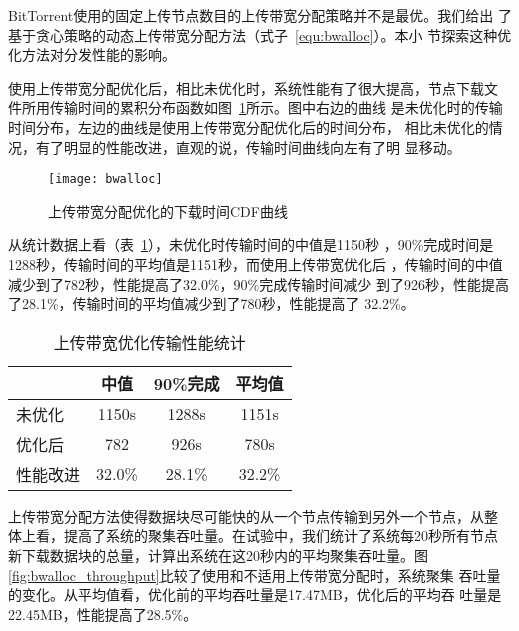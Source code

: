 BitTorrent使用的固定上传节点数目的上传带宽分配策略并不是最优。我们给出
了基于贪心策略的动态上传带宽分配方法（式子~\ref{equ:bwalloc}）。本小
节探索这种优化方法对分发性能的影响。

使用上传带宽分配优化后，相比未优化时，系统性能有了很大提高，节点下载文
件所用传输时间的累积分布函数如图~\ref{fig:bwalloc}所示。图中右边的曲线
是未优化时的传输时间分布，左边的曲线是使用上传带宽分配优化后的时间分布，
相比未优化的情况，有了明显的性能改进，直观的说，传输时间曲线向左有了明
显移动。

\begin{figure}[htbp]
  \centering
  \begin{minipage}{0.6\linewidth}
    \centering
    \texttt{[image: bwalloc]}
    \caption{上传带宽分配优化的下载时间CDF曲线}
    \label{fig:bwalloc}
  \end{minipage}
\end{figure}

从统计数据上看（表~\ref{tbl:bwalloc}），未优化时传输时间的中值是1150秒
，90\%完成时间是1288秒，传输时间的平均值是1151秒，而使用上传带宽优化后
，传输时间的中值减少到了782秒，性能提高了32.0\%，90\%完成传输时间减少
到了926秒，性能提高了28.1\%，传输时间的平均值减少到了780秒，性能提高了
32.2\%。

\begin{table}[htbp]
\centering
\begin{minipage}{0.8\linewidth}
\centering
\caption{上传带宽优化传输性能统计}
\label{tbl:bwalloc}
\begin{tabular}{lccc}

\toprule[1.5pt]
              & 中值 & 90\%完成 & 平均值\\
\midrule[1pt]
未优化    & 1150s & 1288s & 1151s\\
优化后    & 782   & 926s  & 780s\\
性能改进  & 32.0\% & 28.1\% & 32.2\%\\
\bottomrule[1.5pt]
\end{tabular}
\end{minipage}
\end{table}



上传带宽分配方法使得数据块尽可能快的从一个节点传输到另外一个节点，从整
体上看，提高了系统的聚集吞吐量。在试验中，我们统计了系统每20秒所有节点
新下载数据块的总量，计算出系统在这20秒内的平均聚集吞吐量。图~
\ref{fig:bwalloc_throughput}比较了使用和不适用上传带宽分配时，系统聚集
吞吐量的变化。从平均值看，优化前的平均吞吐量是17.47MB，优化后的平均吞
吐量是22.45MB，性能提高了28.5\%。

